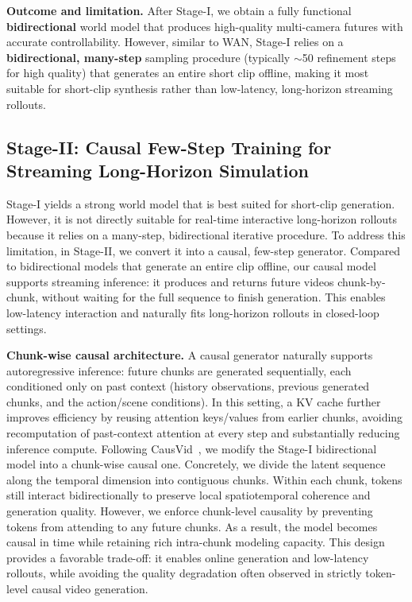 \noindent\textbf{Outcome and limitation.}
After Stage-I, we obtain a fully functional \textbf{bidirectional} world model that produces high-quality multi-camera futures with accurate controllability. However, similar to WAN, Stage-I relies on a \textbf{bidirectional, many-step} sampling procedure (typically $\sim$50 refinement steps for high quality) that generates an entire short clip offline, making it most suitable for short-clip synthesis rather than low-latency, long-horizon streaming rollouts.

\subsection{Stage-II: Causal Few-Step Training for Streaming Long-Horizon Simulation}

Stage-I yields a strong world model that is best suited for short-clip generation. However, it is not directly suitable for real-time interactive long-horizon rollouts because it relies on a many-step, bidirectional iterative procedure.
To address this limitation, in Stage-II, we convert it into a causal, few-step generator.
Compared to bidirectional models that generate an entire clip offline, our causal model supports streaming inference: it produces and returns future videos chunk-by-chunk, without waiting for the full sequence to finish generation. This enables low-latency interaction and naturally fits long-horizon rollouts in closed-loop settings.

\textbf{Chunk-wise causal architecture.}
A causal generator naturally supports autoregressive inference: future chunks are generated sequentially, each conditioned only on past context (history observations, previous generated chunks, and the action/scene conditions). In this setting, a KV cache further improves efficiency by reusing attention keys/values from earlier chunks, avoiding recomputation of past-context attention at every step and substantially reducing inference compute.
Following CausVid~\cite{yin2024slow}, we modify the Stage-I bidirectional model into a chunk-wise causal one. Concretely, we divide the latent sequence along the temporal dimension into contiguous chunks. Within each chunk, tokens still interact bidirectionally to preserve local spatiotemporal coherence and generation quality. However, we enforce chunk-level causality by preventing tokens from attending to any future chunks. 
%
As a result, the model becomes causal in time while retaining rich intra-chunk modeling capacity. 
This design provides a favorable trade-off: it enables online generation and low-latency rollouts, while avoiding the quality degradation often observed in strictly token-level causal video generation.

